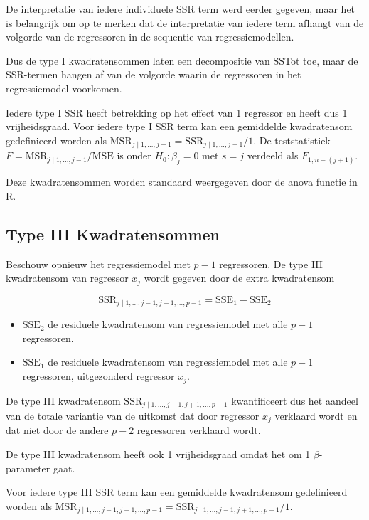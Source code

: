 \documentclass[
  12pt,dutch,coursenotes]{book}
\providecommand{\tightlist}{%
  \setlength{\itemsep}{0pt}\setlength{\parskip}{0pt}}
\theoremstyle{definition}
\theoremstyle{definition}
\theoremstyle{definition}
\theoremstyle{definition}
\theoremstyle{remark}
\begin{document}
De interpretatie van iedere individuele SSR term werd eerder gegeven, maar het is belangrijk om op te merken dat de interpretatie van iedere term afhangt van de volgorde van de regressoren in de sequentie van regressiemodellen.

Dus de type I kwadratensommen laten een decompositie van SSTot toe, maar de SSR-termen hangen af van de volgorde waarin de regressoren in het regressiemodel voorkomen.

Iedere type I SSR heeft betrekking op het effect van 1 regressor en heeft dus 1 vrijheidsgraad.
Voor iedere type I SSR term kan een gemiddelde kwadratensom gedefinieerd worden als \(\text{MSR}_{j\mid 1,\ldots, j-1}=\text{SSR}_{j\mid 1,\ldots, j-1}/1\).
De teststatistiek \(F=\text{MSR}_{j\mid 1,\ldots, j-1}/\text{MSE}\) is onder \(H_0:\beta_j=0\) met \(s=j\) verdeeld als \(F_{1;n-(j+1)}\).

Deze kwadratensommen worden standaard weergegeven door de anova functie in R.

\hypertarget{type-iii-kwadratensommen}{%
\subsection{Type III Kwadratensommen}\label{type-iii-kwadratensommen}}

Beschouw opnieuw het regressiemodel met \(p-1\) regressoren.
De type III kwadratensom van regressor \(x_j\) wordt gegeven door de extra kwadratensom

\[
  \text{SSR}_{j \mid 1,\ldots, j-1,j+1,\ldots, p-1} = \text{SSE}_1-\text{SSE}_2
\]

\begin{itemize}
\tightlist
\item
  \(\text{SSE}_2\) de residuele kwadratensom van regressiemodel met alle \(p-1\) regressoren.
\item
  \(\text{SSE}_1\) de residuele kwadratensom van regressiemodel met alle \(p-1\) regressoren, uitgezonderd regressor \(x_j\).
\end{itemize}

De type III kwadratensom \(\text{SSR}_{j \mid 1,\ldots, j-1,j+1,\ldots, p-1}\) kwantificeert dus het aandeel van de totale variantie van de uitkomst dat door regressor \(x_j\) verklaard wordt en dat niet door de andere \(p-2\) regressoren verklaard wordt.

De type III kwadratensom heeft ook 1 vrijheidsgraad omdat het om 1 \(\beta\)-parameter gaat.

Voor iedere type III SSR term kan een gemiddelde kwadratensom gedefinieerd worden als \(\text{MSR}_{j \mid 1,\ldots, j-1,j+1,\ldots, p-1}=\text{SSR}_{j \mid 1,\ldots, j-1,j+1,\ldots, p-1}/1\).
\end{document}
